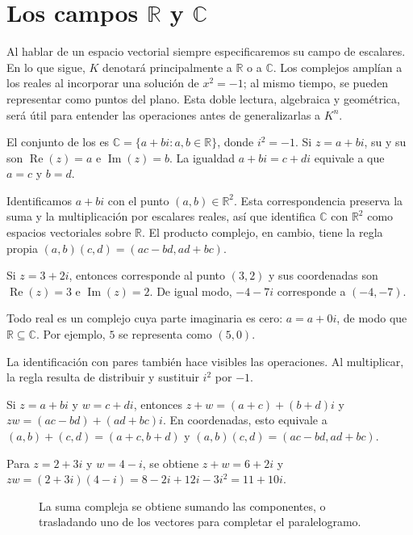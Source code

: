 \section{Los campos \texorpdfstring{$\mathbb{R}$}{R} y \texorpdfstring{$\mathbb{C}$}{C}}
Al hablar de un espacio vectorial siempre especificaremos su campo de escalares. En lo que sigue, $K$ denotará principalmente a $\mathbb{R}$ o a $\mathbb{C}$. Los complejos amplían a los reales al incorporar una solución de $x^2=-1$; al mismo tiempo, se pueden representar como puntos del plano. Esta doble lectura, algebraica y geométrica, será útil para entender las operaciones antes de generalizarlas a $K^n$.
\begin{definition}
El conjunto de los  es
$\mathbb{C}=\{a+bi:a,b\in\mathbb{R}\}$, donde $i^2=-1$.
Si $z=a+bi$, su  y su  son
$\operatorname{Re}(z)=a$ e $\operatorname{Im}(z)=b$. La igualdad $a+bi=c+di$
equivale a que $a=c$ y $b=d$.
\end{definition}
Identificamos $a+bi$ con el punto $(a,b)\in\mathbb{R}^2$. Esta correspondencia
preserva la suma y la multiplicación por escalares reales, así que identifica
$\mathbb{C}$ con $\mathbb{R}^2$ como espacios vectoriales sobre $\mathbb{R}$.
El producto complejo, en cambio, tiene la regla propia
$(a,b)(c,d)=(ac-bd,ad+bc)$.
\begin{example}
Si $z=3+2i$, entonces corresponde al punto $(3,2)$ y sus coordenadas son
$\operatorname{Re}(z)=3$ e $\operatorname{Im}(z)=2$. De igual modo, $-4-7i$
corresponde a $(-4,-7)$.
\end{example}
\begin{example}
Todo real es un complejo cuya parte imaginaria es cero: $a=a+0i$, de modo que
$\mathbb{R}\subseteq\mathbb{C}$. Por ejemplo, $5$ se representa como $(5,0)$.
\end{example}
La identificación con pares también hace visibles las operaciones. Al multiplicar,
la regla resulta de distribuir y sustituir $i^2$ por $-1$.
\begin{definition}
Si $z=a+bi$ y $w=c+di$, entonces
$z+w=(a+c)+(b+d)i$ y $zw=(ac-bd)+(ad+bc)i$.
En coordenadas, esto equivale a
$(a,b)+(c,d)=(a+c,b+d)$ y $(a,b)(c,d)=(ac-bd,ad+bc)$.
\end{definition}
\begin{example}
Para $z=2+3i$ y $w=4-i$, se obtiene $z+w=6+2i$ y
$zw=(2+3i)(4-i)=8-2i+12i-3i^2=11+10i$.
\end{example}
\begin{figure}[htbp]
  \centering
  
  \caption{La suma compleja se obtiene sumando las componentes, o trasladando uno de los vectores para completar el paralelogramo.}
  \label{fig:suma-compleja}
\end{figure}
